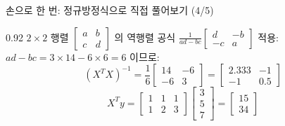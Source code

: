 \begin{frame}{손으로 한 번: 정규방정식으로 직접 풀어보기 (4/5)}
\begin{center}\begin{varwidth}{0.92\textwidth}
  $2 \times 2$ 행렬 $\begin{bmatrix}a&b\\c&d\end{bmatrix}$ 의
  역행렬 공식 $\frac{1}{ad-bc}\begin{bmatrix}d&-b\\-c&a\end{bmatrix}$
  적용: $ad-bc = 3\times14-6\times6 = 6$ 이므로:
  \[
  (X^TX)^{-1} = \frac{1}{6}\begin{bmatrix}14&-6\\-6&3\end{bmatrix}
  = \begin{bmatrix}2.333&-1\\-1&0.5\end{bmatrix}
  \]
  \[
  X^Ty = \begin{bmatrix}1&1&1\\1&2&3\end{bmatrix}
  \begin{bmatrix}3\\5\\7\end{bmatrix}
  = \begin{bmatrix}15\\34\end{bmatrix}
  \]
\end{varwidth}\end{center}
\end{frame}
